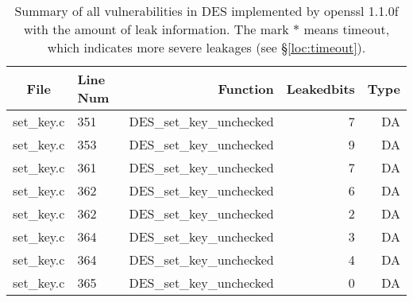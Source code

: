 \begin{table}%
\centering\tiny\scriptsize
\caption{Summary of all vulnerabilities in DES implemented by openssl 1.1.0f with the amount of leak information. The mark $*$ means timeout, which indicates more severe leakages (see \S\ref{loc:timeout}).}\label{tab:DESopenssl}
\begin{tabular}{clrrr}
\hline
\textbf{File} & \textbf{Line Num} & \textbf{Function} & \textbf{Leakedbits} & \textbf{Type} \\\hline
set\_key.c& 351&DES\_set\_key\_unchecked&7 &DA\\
set\_key.c& 353&DES\_set\_key\_unchecked&9 &DA\\
set\_key.c& 361&DES\_set\_key\_unchecked&7 &DA\\
set\_key.c& 362&DES\_set\_key\_unchecked&6 &DA\\
set\_key.c& 362&DES\_set\_key\_unchecked&2 &DA\\
set\_key.c& 364&DES\_set\_key\_unchecked&3 &DA\\
set\_key.c& 364&DES\_set\_key\_unchecked&4 &DA\\
set\_key.c& 365&DES\_set\_key\_unchecked&0 &DA\\
\hline
\end{tabular}
\end{table}